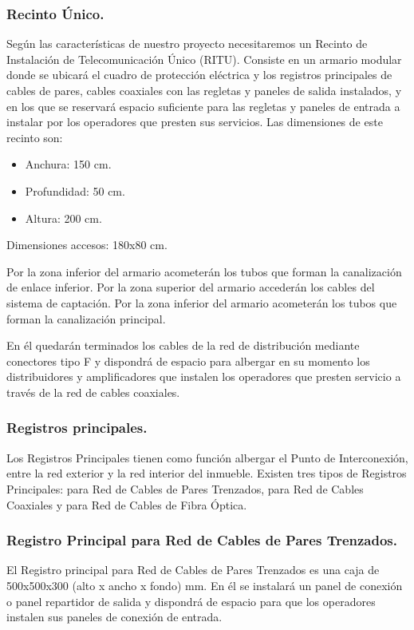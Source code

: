 \subsubsection{Recinto Único.}
Según las características de nuestro proyecto necesitaremos un Recinto de Instalación de Telecomunicación Único (RITU). Consiste en un armario modular donde se ubicará el cuadro de protección eléctrica y los registros principales de cables de pares, cables coaxiales con las regletas y paneles de salida instalados, y en los que se reservará espacio suficiente para las regletas y paneles de entrada a instalar por los operadores que presten sus servicios.
Las dimensiones de este recinto son:

\begin{itemize}
	\item Anchura: 150 cm.
	\item Profundidad: 50 cm.
	\item Altura: 200 cm.
\end{itemize}
Dimensiones accesos: 180x80 cm.

Por la zona inferior del armario acometerán los tubos que forman la canalización de enlace inferior.
Por la zona superior del armario accederán los cables del sistema de captación.
Por la zona inferior del armario acometerán los tubos que forman la canalización principal.

En él quedarán terminados los cables de la red de distribución mediante conectores tipo F y dispondrá de espacio para albergar en su momento los distribuidores y amplificadores que instalen los operadores que presten servicio a través de la red de cables coaxiales.

\subsubsection{Registros principales.}
Los Registros Principales tienen como función albergar el Punto de Interconexión, entre la red exterior y la red interior del inmueble.
Existen tres tipos de Registros Principales: para Red de Cables de Pares Trenzados, para Red de Cables Coaxiales y para Red de Cables de Fibra Óptica.

\subsubsection*{Registro Principal para Red de Cables de Pares Trenzados.}
El Registro principal para Red de Cables de Pares Trenzados es una caja de 500x500x300 (alto x ancho x fondo) mm.
En él se instalará un panel de conexión o panel repartidor de salida y dispondrá de espacio para que los operadores instalen sus paneles de conexión de entrada.


